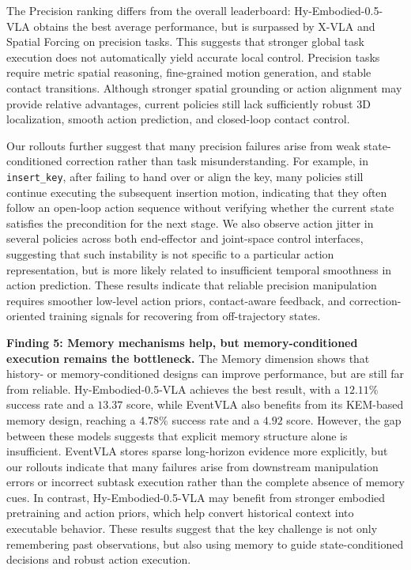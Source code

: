 The Precision ranking differs from the overall leaderboard: Hy-Embodied-0.5-VLA obtains the best average performance, but is surpassed by X-VLA and Spatial Forcing on precision tasks. This suggests that stronger global task execution does not automatically yield accurate local control. Precision tasks require metric spatial reasoning, fine-grained motion generation, and stable contact transitions. Although stronger spatial grounding or action alignment may provide relative advantages, current policies still lack sufficiently robust 3D localization, smooth action prediction, and closed-loop contact control.

Our rollouts further suggest that many precision failures arise from weak state-conditioned correction rather than task misunderstanding. For example, in \texttt{insert\_key}, after failing to hand over or align the key, many policies still continue executing the subsequent insertion motion, indicating that they often follow an open-loop action sequence without verifying whether the current state satisfies the precondition for the next stage. We also observe action jitter in several policies across both end-effector and joint-space control interfaces, suggesting that such instability is not specific to a particular action representation, but is more likely related to insufficient temporal smoothness in action prediction. These results indicate that reliable precision manipulation requires smoother low-level action priors, contact-aware feedback, and correction-oriented training signals for recovering from off-trajectory states.

\textcolor{Blue_1}{\textbf{Finding 5: Memory mechanisms help, but memory-conditioned execution remains the bottleneck.}}
The Memory dimension shows that history- or memory-conditioned designs can improve performance, but are still far from reliable. Hy-Embodied-0.5-VLA achieves the best result, with a $12.11\%$ success rate and a $13.37$ score, while EventVLA also benefits from its KEM-based memory design, reaching a $4.78\%$ success rate and a $4.92$ score. However, the gap between these models suggests that explicit memory structure alone is insufficient. EventVLA stores sparse long-horizon evidence more explicitly, but our rollouts indicate that many failures arise from downstream manipulation errors or incorrect subtask execution rather than the complete absence of memory cues. In contrast, Hy-Embodied-0.5-VLA may benefit from stronger embodied pretraining and action priors, which help convert historical context into executable behavior. These results suggest that the key challenge is not only remembering past observations, but also using memory to guide state-conditioned decisions and robust action execution.

